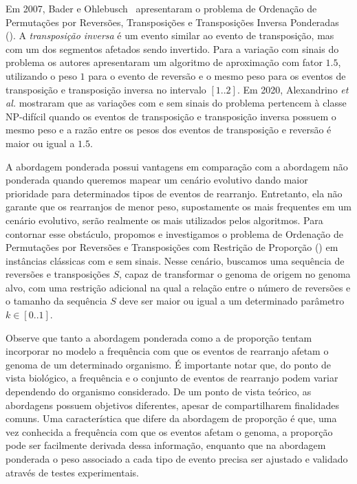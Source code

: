 Em 2007, Bader e Ohlebusch~\cite{2007-bader-ohlebusch} apresentaram o problema de Ordenação de Permutações por Reversões, Transposições e Transposições Inversa Ponderadas (\SbWRTIT). A \emph{transposição inversa} é um evento similar ao evento de transposição, mas com um dos segmentos afetados sendo invertido. Para a variação com sinais do problema os autores apresentaram um algoritmo de aproximação com fator $1.5$, utilizando o peso $1$ para o evento de reversão e o mesmo peso para os eventos de transposição e transposição inversa no intervalo $[1..2]$. Em 2020, Alexandrino \textit{et al.}\cite{2020c-alexandrino-etal} mostraram que as variações com e sem sinais do problema \SbWRTIT{} pertencem à classe NP-difícil quando os eventos de transposição e transposição inversa possuem o mesmo peso e a razão entre os pesos dos eventos de transposição e reversão é maior ou igual a $1.5$.

A abordagem ponderada possui vantagens em comparação com a abordagem não ponderada quando queremos mapear um cenário evolutivo dando maior prioridade para determinados tipos de eventos de rearranjo. Entretanto, ela não garante que os rearranjos de menor peso, supostamente os mais frequentes em um cenário evolutivo, serão realmente os mais utilizados pelos algoritmos. Para contornar esse obstáculo, propomos e investigamos o problema de Ordenação de Permutações por Reversões e Transposições com Restrição de Proporção (\SbPRT) em instâncias clássicas com e sem sinais. Nesse cenário, buscamos uma sequência de reversões e transposições $S$, capaz de transformar o genoma de origem no genoma alvo, com uma restrição adicional na qual a relação entre o número de reversões e o tamanho da sequência $S$ deve ser maior ou igual a um determinado parâmetro $k \in [0..1]$. 

Observe que tanto a abordagem ponderada como a de proporção tentam incorporar no modelo a frequência com que os eventos de rearranjo afetam o genoma de um determinado organismo. É importante notar que, do ponto de vista biológico, a frequência e o conjunto de eventos de rearranjo podem variar dependendo do organismo considerado. De um ponto de vista teórico, as abordagens possuem objetivos diferentes, apesar de compartilharem finalidades comuns. Uma característica que difere da abordagem de proporção é que, uma vez conhecida a frequência com que os eventos afetam o genoma, a proporção pode ser facilmente derivada dessa informação, enquanto que na abordagem ponderada o peso associado a cada tipo de evento precisa ser ajustado e validado através de testes experimentais.

